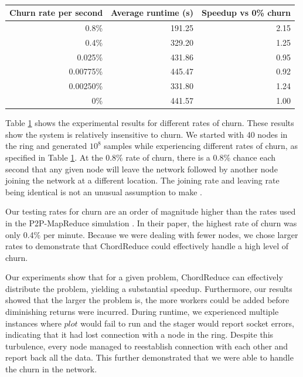 \documentclass[10pt, conference, compsocconf]{IEEEtran}
\begin{document}
\begin{table}
    \centering
    \begin{tabular}{|r|r|r|} 
        \hline 
        Churn rate per second & Average runtime (s) & Speedup vs 0\% churn\\ \hline{}
        0.8\% & 191.25 & 2.15 \\ \hline
        0.4\% & 329.20 & 1.25 \\ \hline
        0.025\% & 431.86 & 0.95 \\ \hline 
        0.00775\%  & 445.47 & 0.92 \\ \hline 
        0.00250\% & 331.80  &  1.24 \\ \hline 
        0\% & 441.57 & 1.00 \\ \hline
    \end{tabular}
    \caption{} 
    \label{churnSpeed}
\end{table}


Table \ref{churnSpeed} shows the experimental results for different rates of churn. These results show the system  is relatively insensitive to churn.  We started with 40 nodes in the ring and generated $10^{8}$ samples while experiencing different rates of churn, as specified in Table \ref{churnSpeed}.  At the 0.8\% rate of churn, there is a 0.8\% chance each second that any given node will leave the network followed by another node joining the network at a different location. The joining rate and leaving rate being identical is not an unusual assumption to make \cite{marozzo2012p2p} \cite{load}.  

Our testing rates for churn are an order of magnitude higher than the rates used in the P2P-MapReduce simulation  \cite{marozzo2012p2p}.  In their paper, the highest rate of churn was only 0.4\% per minute. Because we were dealing with fewer nodes, we chose larger rates to demonstrate that ChordReduce could effectively handle a high level of churn.  


Our experiments show that for a given problem, ChordReduce can effectively distribute the problem, yielding a substantial speedup.  Furthermore, our results showed that the larger the problem is, the more workers could be added before diminishing returns were incurred.  During runtime, we experienced multiple instances where $plot$ would fail to run and the stager would report socket errors, indicating that it had lost connection with a node in the ring.  Despite this turbulence, every node managed to reestablish connection with each other and report back all the data.  This further demonstrated that we were able to handle the churn in the network.
\end{document}
